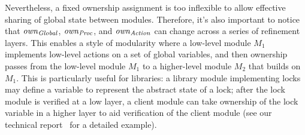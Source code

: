 Nevertheless, a fixed ownership assignment is too inflexible to allow effective sharing of global state between modules.
Therefore, it's also important to notice that $\mathit{own}_{\mathit{Global}}$, $\mathit{own}_{\mathit{Proc}}$, and $\mathit{own}_{\mathit{Action}}$ can change across a series of refinement layers.
This enables a style of modularity where a low-level module $M_1$ implements low-level actions on a set of global variables,
and then ownership passes from the low-level module $M_1$ to a higher-level module $M_2$ that builds on $M_1$.
This is particularly useful for libraries:
a library module implementing locks may define a variable to represent the abstract state of a lock;
after the lock module is verified at a low layer,
a client module can take ownership of the lock variable in a higher layer to aid verification of the client module
(see our technical report~\cite{gc-techreport} for a detailed example).
